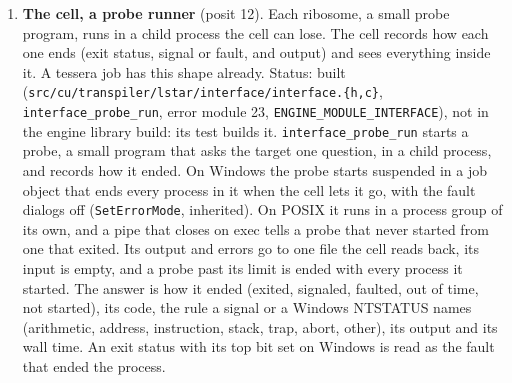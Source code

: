 \begin{enumerate}
\begin{itemize}
\begin{enumerate}
\begin{itemize}
\end{itemize}
\item \textbf{The cell, a probe runner} (posit 12). Each ribosome, a small probe program, runs in a child process the cell can lose. The cell records how each one ends (exit status, signal or fault, and output) and sees everything inside it. A tessera job has this shape already. Status: built (\texttt{src/\allowbreak{}cu/\allowbreak{}transpiler/\allowbreak{}lstar/\allowbreak{}interface/\allowbreak{}interface.\allowbreak{}\{h,c\}}, \texttt{interface\_\allowbreak{}probe\_\allowbreak{}run}, error module 23, \texttt{ENGINE\_\allowbreak{}MODULE\_\allowbreak{}INTERFACE}), not in the engine library build: its test builds it. \texttt{interface\_\allowbreak{}probe\_\allowbreak{}run} starts a probe, a small program that asks the target one question, in a child process, and records how it ended. On Windows the probe starts suspended in a job object that ends every process in it when the cell lets it go, with the fault dialogs off (\texttt{Set\allowbreak{}Error\allowbreak{}Mode}, inherited). On POSIX it runs in a process group of its own, and a pipe that closes on exec tells a probe that never started from one that exited. Its output and errors go to one file the cell reads back, its input is empty, and a probe past its limit is ended with every process it started. The answer is how it ended (exited, signaled, faulted, out of time, not started), its code, the rule a signal or a Windows NTSTATUS names (arithmetic, address, instruction, stack, trap, abort, other), its output and its wall time. An exit status with its top bit set on Windows is read as the fault that ended the process.


\end{enumerate}
\end{itemize}
\end{enumerate}
